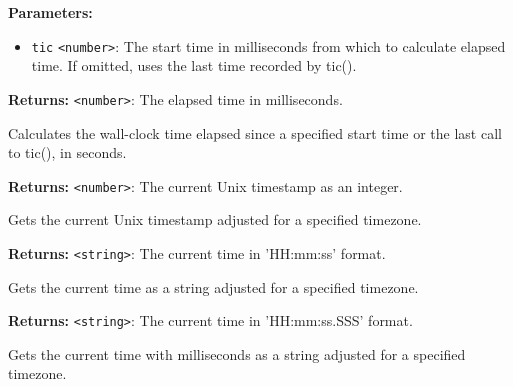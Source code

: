 \documentclass[12pt,a4paper]{article}
\begin{document}
\vspace{5mm}
\noindent {}


\noindent \textbf{Parameters:}
\begin{itemize}
  \item \texttt{tic} \texttt{<number>}: The start time in milliseconds from which to calculate elapsed time. If omitted, uses the last time recorded by \textasciigrave{}tic()\textasciigrave{}.
\end{itemize}

\noindent \textbf{Returns:} \texttt{<number>}: The elapsed time in milliseconds.

\noindent Calculates the wall-clock time elapsed since a specified start time or the last call to \textasciigrave{}tic()\textasciigrave{}, in seconds.

\vspace{5mm}
\noindent {}


\noindent \textbf{Returns:} \texttt{<number>}: The current Unix timestamp as an integer.

\noindent Gets the current Unix timestamp adjusted for a specified timezone.

\vspace{5mm}
\noindent {}


\noindent \textbf{Returns:} \texttt{<string>}: The current time in 'HH:mm:ss' format.

\noindent Gets the current time as a string adjusted for a specified timezone.

\vspace{5mm}
\noindent {}


\noindent \textbf{Returns:} \texttt{<string>}: The current time in 'HH:mm:ss.SSS' format.

\noindent Gets the current time with milliseconds as a string adjusted for a specified timezone.

\vspace{5mm}
\noindent {}
\end{document}
